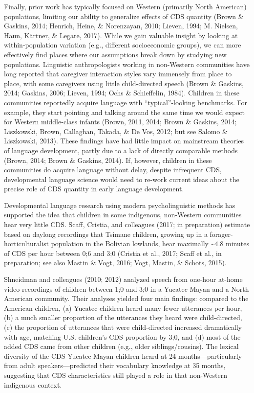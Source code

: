 \documentclass[floatsintext,man]{apa6}
\theoremstyle{definition}
\theoremstyle{definition}
\theoremstyle{definition}
\theoremstyle{remark}
\begin{document}
Finally, prior work has typically focused on Western (primarily North
American) populations, limiting our ability to generalize effects of CDS
quantity (Brown \& Gaskins, 2014; Henrich, Heine, \& Norenzayan, 2010;
Lieven, 1994; M. Nielsen, Haun, Kärtner, \& Legare, 2017). While we gain
valuable insight by looking at within-population variation (e.g.,
different socioeconomic groups), we can more effectively find places
where our assumptions break down by studying new populations. Linguistic
anthropologists working in non-Western communities have long reported
that caregiver interaction styles vary immensely from place to place,
with some caregivers using little child-directed speech (Brown \&
Gaskins, 2014; Gaskins, 2006; Lieven, 1994; Ochs \& Schieffelin, 1984).
Children in these communities reportedly acquire language with
\enquote{typical}-looking benchmarks. For example, they start pointing
and talking around the same time we would expect for Western
middle-class infants (Brown, 2011, 2014; Brown \& Gaskins, 2014;
Liszkowski, Brown, Callaghan, Takada, \& De Vos, 2012; but see Salomo \&
Liszkowski, 2013). These findings have had little impact on mainstream
theories of language development, partly due to a lack of directly
comparable methods (Brown, 2014; Brown \& Gaskins, 2014). If, however,
children in these communities do acquire language without delay, despite
infrequent CDS, developmental language science would need to re-work
current ideas about the precise role of CDS quantity in early language
development.

Developmental language research using modern psycholinguistic methods
has supported the idea that children in some indigenous, non-Western
communities hear very little CDS. Scaff, Cristia, and colleagues (2017;
in preparation) estimate based on daylong recordings that Tsimane
children, growing up in a forager-horticulturalist population in the
Bolivian lowlands, hear maximally \textasciitilde{}4.8 minutes of CDS
per hour between 0;6 and 3;0 (Cristia et al., 2017; Scaff et al., in
preparation; see also Mastin \& Vogt, 2016; Vogt, Mastin, \& Schots,
2015).

Shneidman and colleagues (2010; 2012) analyzed speech from one-hour
at-home video recordings of children between 1;0 and 3;0 in a Yucatec
Mayan and a North American community. Their analyses yielded four main
findings: compared to the American children, (a) Yucatec children heard
many fewer utterances per hour, (b) a much smaller proportion of the
utterances they heard were child-directed, (c) the proportion of
utterances that were child-directed increased dramatically with age,
matching U.S. children's CDS proportion by 3;0, and (d) most of the
added CDS came from other children (e.g., older siblings/cousins). The
lexical diversity of the CDS Yucatec Mayan children heard at 24
months---particularly from adult speakers---predicted their vocabulary
knowledge at 35 months, suggesting that CDS characteristics still played
a role in that non-Western indigenous context.
\end{document}
